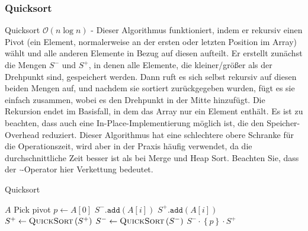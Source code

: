 \documentclass[a4paper]{article}
\begin{document}
   
\newpage    

    \subsubsection{Quicksort}\label{Quicksort}
    Quicksort $\mathcal{O}(n\log n)$ - Dieser Algorithmus funktioniert, indem er rekursiv einen Pivot (ein Element, normalerweise an der ersten oder letzten Position im Array) wählt und alle anderen Elemente in Bezug auf diesen aufteilt. Er erstellt zunächst die Mengen $S^-$ und $S^+$, in denen alle Elemente, die kleiner/größer als der Drehpunkt sind, gespeichert werden. Dann ruft es sich selbst rekursiv auf diesen beiden Mengen auf, und nachdem sie sortiert zurückgegeben wurden, fügt es sie einfach zusammen, wobei es den Drehpunkt in der Mitte hinzufügt. Die Rekursion endet im Basisfall, in dem das Array nur ein Element enthält. Es ist zu beachten, dass auch eine In-Place-Implementierung möglich ist, die den Speicher-Overhead reduziert. Dieser Algorithmus hat eine schlechtere obere Schranke für die Operationszeit, wird aber in der Praxis häufig verwendet, da die durchschnittliche Zeit besser ist als bei Merge und Heap Sort. Beachten Sie, dass der $\cdot$-Operator hier Verkettung bedeutet.

    \begin{algorithm}[h]
        \caption{Quicksort}
        \begin{algorithmic}
            \label{alg:Quicksort}
        \State \Return $A$
        \EndIf
        \State Pick pivot $p \gets A[0]$
        \State $S^-\texttt{.add}\left(A\left[i\right]\right)$
        \Else
        \State $S^+\texttt{.add}\left(A\left[i\right]\right)$
        \EndIf
        \EndFor
        \State $S^+ \gets \textsc{QuickSort}\left(S^+\right)$
        \State $S^- \gets \textsc{QuickSort}\left(S^-\right)$
        \State \Return $S^- \cdot \left\lbrace p\right\rbrace \cdot S^+$
        \EndFunction
        \end{algorithmic}
        \end{algorithm}
\end{document}
